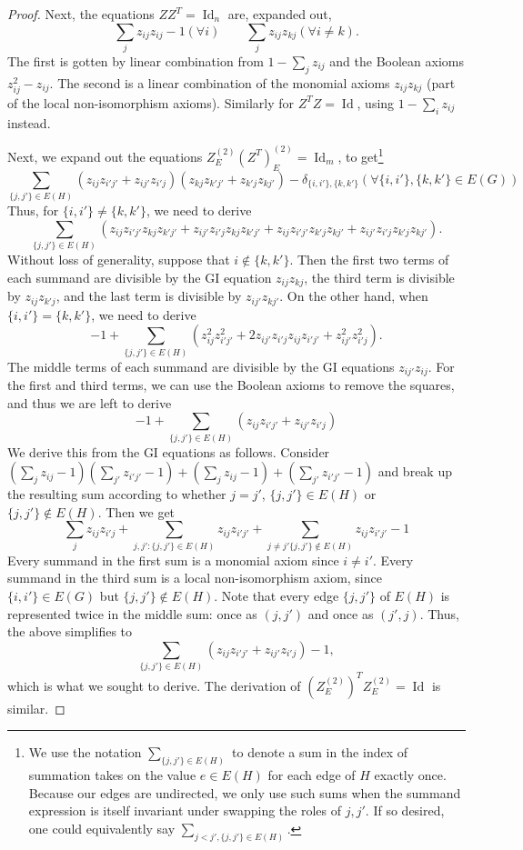 \documentclass[10pt,a4paper]{article}
\theoremstyle{definition}
\DeclareMathOperator{\Id}{Id}
\begin{document}
\begin{proof}
Next, the equations $ZZ^T=\Id_n$ are, expanded out, 
\[
\sum_j z_{ij} z_{ij} -1 (\forall i) \qquad \sum_j z_{ij} z_{kj} (\forall i \neq k).
\]
The first is gotten by linear combination from $1-\sum_j z_{ij}$ and the Boolean axioms $z_{ij}^2 - z_{ij}$. The second is a linear combination of the monomial axioms $z_{ij} z_{kj}$ (part of the local non-isomorphism axioms). Similarly for $Z^T Z = \Id$, using $1 - \sum_i z_{ij}$ instead.

Next, we expand out the equations $Z^{(2)}_E (Z^T)^{(2)}_E = \Id_m$, to get\footnote{We use the notation $\sum_{\{j,j'\} \in E(H)}$ to denote a sum in the index of summation takes on the value $e \in E(H)$ for each edge of $H$ exactly once. Because our edges are undirected, we only use such sums when the summand expression is itself invariant under swapping the roles of $j,j'$. If so desired, one could equivalently say $\sum_{j < j', \{j,j'\} \in E(H)}$.}
\[
\sum_{\{j,j'\} \in E(H)} (z_{ij} z_{i'j'} + z_{ij'} z_{i'j})(z_{kj} z_{k'j'} + z_{k'j} z_{kj'}) - \delta_{\{i,i'\}, \{k,k'\}} (\forall \{i,i'\}, \{k,k'\} \in E(G))
\]
Thus, for $\{i,i'\} \neq \{k,k'\}$, we need to derive
\[
\sum_{\{j,j'\} \in E(H)} \left( z_{ij} z_{i'j'} z_{kj} z_{k'j'}+ z_{ij'} z_{i'j} z_{kj} z_{k'j'} + z_{ij} z_{i'j'} z_{k'j} z_{kj'} + z_{ij'} z_{i'j} z_{k'j} z_{kj'} \right).
\]
Without loss of generality, suppose that $i \notin \{k,k'\}$. Then the first two terms of each summand are divisible by the \textsc{GI} equation $z_{ij} z_{kj}$, the third term is divisible by $z_{ij} z_{k'j}$, and the last term is divisible by $z_{ij'} z_{kj'}$. 
On the other hand, when $\{i,i'\} = \{k,k'\}$, we need to derive
\[
-1 + \sum_{\{j,j'\} \in E(H)} \left( z_{ij}^2 z_{i'j'}^2 + 2 z_{ij'} z_{i'j} z_{ij} z_{i'j'} + z_{ij'}^2 z_{i'j}^2 \right).
\]
The middle terms of each summand are divisible by the \textsc{GI} equations $z_{ij'} z_{ij}$. For the first and third terms, we can use the Boolean axioms to remove the squares, and thus we are left to derive
\begin{equation} \label{eq:Z2}
-1 + \sum_{\{j,j'\} \in E(H)} \left(z_{ij} z_{i'j'} + z_{ij'} z_{i'j} \right)
\end{equation}
We derive this from the \textsc{GI} equations as follows. Consider $(\sum_{j} z_{ij} -1)(\sum_{j'} z_{i'j'} -1) + (\sum_{j} z_{ij} -1) + (\sum_{j'} z_{i'j'} -1)$ and break up the resulting sum according to whether $j = j'$, $\{j,j'\} \in E(H)$ or $\{j,j'\} \notin E(H)$. Then we get
\[
\sum_j z_{ij} z_{i'j}  + \sum_{j,j' : \{j,j'\} \in E(H)} z_{ij} z_{i'j'} + \sum_{j \neq j' \{j,j'\} \notin E(H)} z_{ij} z_{i'j'} - 1
\]
Every summand in the first sum is a monomial axiom since $i \neq i'$. Every summand in the third sum is a local non-isomorphism axiom, since $\{i,i'\} \in E(G)$ but $\{j,j'\} \notin E(H)$. Note that every edge $\{j,j'\}$ of $E(H)$ is represented twice in the middle sum: once as $(j,j')$ and once as $(j',j)$. Thus, the above simplifies to 
\[
\sum_{\{j,j'\} \in E(H)} (z_{ij} z_{i'j'} + z_{ij'} z_{i'j}) -1,
\]
which is what we sought to derive. The derivation of $(Z^{(2)}_E)^T Z^{(2)}_E = \Id$ is similar.


\end{proof}
\end{document}
